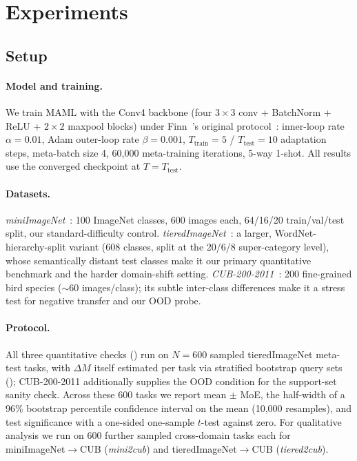 \section{Experiments}
\label{sec:experiments}

\subsection{Setup}
\label{sec:setup}

\paragraph{Model and training.} We train MAML with the Conv4 backbone (four $3{\times}3$ conv + BatchNorm + ReLU + $2{\times}2$ maxpool blocks) under Finn~\etal's original protocol~\cite{finn2017model}: inner-loop rate $\alpha{=}0.01$, Adam outer-loop rate $\beta{=}0.001$, $T_{\text{train}}{=}5$ / $T_{\text{test}}{=}10$ adaptation steps, meta-batch size 4, 60{,}000 meta-training iterations, 5-way 1-shot. All results use the converged checkpoint at $T{=}T_{\text{test}}$.

\paragraph{Datasets.} \emph{miniImageNet}~\cite{ravi2017optimization}: 100 ImageNet classes, 600 images each, 64/16/20 train/val/test split, our standard-difficulty control. \emph{tieredImageNet}~\cite{ren2018meta}: a larger, WordNet-hierarchy-split variant (608 classes, split at the 20/6/8 super-category level), whose semantically distant test classes make it our primary quantitative benchmark and the harder domain-shift setting. \emph{CUB-200-2011}~\cite{welinder2010caltech}: 200 fine-grained bird species ($\sim$60 images/class); its subtle inter-class differences make it a stress test for negative transfer and our OOD probe.

\paragraph{Protocol.} All three quantitative checks () run on $N{=}600$ sampled tieredImageNet meta-test tasks, with $\Delta M$ itself estimated per task via stratified bootstrap query sets (); CUB-200-2011 additionally supplies the OOD condition for the support-set sanity check. Across these 600 tasks we report mean $\pm$ MoE, the half-width of a 96\% bootstrap percentile confidence interval on the mean (10{,}000 resamples), and test \biadt significance with a one-sided one-sample $t$-test against zero. For qualitative analysis we run \fama on 600 further sampled cross-domain tasks each for miniImageNet$\to$CUB (\emph{mini2cub}) and tieredImageNet$\to$CUB (\emph{tiered2cub}).

